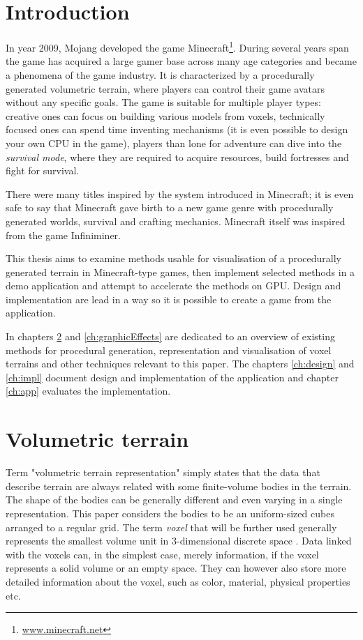 \newcommand{\imagesExtension}{png}

\chapter{Introduction}
In year 2009, Mojang developed the game Minecraft\footnote{\url{www.minecraft.net}}. During several years span the game has acquired a large gamer base across many age categories and became a phenomena of the game industry. It is characterized by a procedurally generated volumetric terrain, where players can control their game avatars without any specific goals. The game is suitable for multiple player types: creative ones can focus on building various models from voxels, technically focused ones can spend time inventing mechanisms (it is even possible to design your own CPU in the game), players than lone for adventure can dive into the \textit{survival mode}, where they are required to acquire resources, build fortresses and fight for survival.

There were many titles inspired by the system introduced in Minecraft; it is even safe to say that Minecraft gave birth to a new game genre with procedurally generated worlds, survival and crafting mechanics. Minecraft itself was inspired from the game Infiniminer.

\putImage[The Minecraft game]{minecraftSshot.\imagesExtension}{width=0.9\textwidth}

This thesis aims to examine methods usable for visualisation of a procedurally generated terrain in Minecraft-type games, then implement selected methods in a demo application and attempt to accelerate the methods on GPU. Design and implementation are lead in a way so it is possible to create a game from the application.

In chapters \ref{ch:volumetricTerrain} and \ref{ch:graphicEffects} are dedicated to an overview of existing methods for procedural generation, representation and visualisation of voxel terrains and other techniques relevant to this paper. The chapters \ref{ch:design} and \ref{ch:impl} document design and implementation of the application and chapter \ref{ch:app} evaluates the implementation.

\chapter{Volumetric terrain} \label{ch:volumetricTerrain}
Term "volumetric terrain representation" simply states that the data that describe terrain are always related with some finite-volume bodies in the terrain. The shape of the bodies can be generally different and even varying in a single representation. This paper considers the bodies to be an uniform-sized cubes arranged to a regular grid. The term \textit{voxel} that will be further used generally represents the smallest volume unit in 3-dimensional discrete space \cite{ZaraJiri2004Mpg}. Data linked with the voxels can, in the simplest case, merely information, if the voxel represents a solid volume or an empty space. They can however also store more detailed information about the voxel, such as color, material, physical properties etc.

